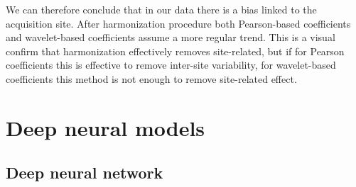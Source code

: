 \documentclass[11pt]{report}
\begin{document}
We can therefore conclude that in our data there is a bias linked to the acquisition site.
After harmonization procedure both Pearson-based coefficients and wavelet-based coefficients assume a more regular trend.
This is a visual confirm that harmonization effectively removes site-related, but if for Pearson coefficients this is effective to remove inter-site variability, for wavelet-based coefficients this method is not enough to remove site-related effect.




\newpage
\chapter{Deep neural models} \label{chap:deep_models}

\section{Deep neural network}
\end{document}
